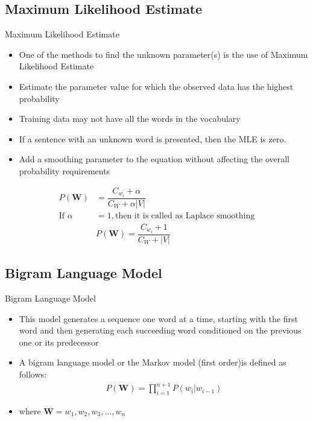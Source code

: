 \subsection{Maximum Likelihood Estimate}
\begin{frame}{Maximum Likelihood Estimate}
\begin{itemize}
	\item One of the methods to find the unknown parameter(s) is the use of Maximum Likelihood Estimate
	\item Estimate the parameter value for which the observed data has the highest probability
\end{itemize}
\begin{itemize}
	\item Training data may not have all the words in the vocabulary
	\item If a sentence with an unknown word is presented, then the MLE is zero.
	\item Add a smoothing parameter to the equation without affecting the overall probability requirements
\end{itemize}
\begin{align}
P(\mathbf{W}) &= \dfrac{C_{w_i}+\alpha}{C_W + \alpha|V|}\\
\text{If } \alpha &= 1,\text{then it is called as Laplace smoothing}\\
&P(\mathbf{W}) = \dfrac{C_{w_i}+1}{C_W + |V|}
\end{align}
\end{frame}

\subsection{Bigram Language Model}
\begin{frame}{Bigram Language Model}
	\begin{itemize}
		\item This model generates a sequence
		one word at a time, starting with the first word and then generating each
		succeeding word conditioned on the previous one or its predecessor
		\item A bigram language model or the Markov model (first order)is defined as follows:
		\begin{align}
		P(\textbf{W}) = \prod_{i=1}^{n+1}P(w_i|w_{i-1})
		\end{align}
		\item[] where $\textbf{W} = {w_1,w_2,w_3,\ldots,w_n}$
	\end{itemize}
\end{frame}

